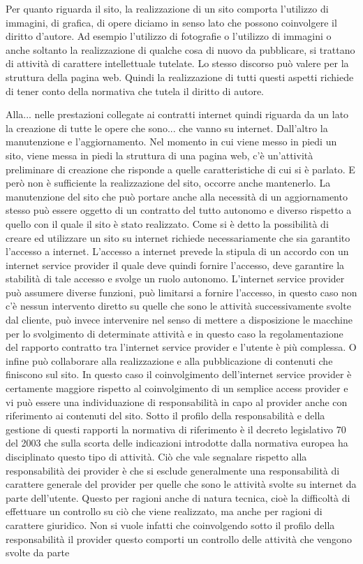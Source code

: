  Per quanto riguarda il sito, la realizzazione di un sito comporta l'utilizzo di immagini, di grafica, di opere diciamo in senso lato che possono coinvolgere il diritto d'autore. Ad esempio l'utilizzo di fotografie o l'utilizzo di immagini o anche soltanto la realizzazione di qualche cosa di nuovo da pubblicare, si trattano di attività di carattere intellettuale tutelate. Lo stesso discorso può valere per la struttura della pagina web. Quindi la realizzazione di tutti questi aspetti richiede di tener conto della normativa che tutela il diritto di autore. 
 

 Alla... nelle prestazioni collegate ai contratti internet quindi riguarda da un lato la creazione di tutte le opere che sono... che vanno su internet. Dall'altro la manutenzione e l'aggiornamento. Nel momento in cui viene messo in piedi un sito, viene messa in piedi la struttura di una pagina web, c'è un'attività preliminare di creazione che risponde a quelle caratteristiche di cui si è parlato. E però non è sufficiente la realizzazione del sito, occorre anche mantenerlo. La manutenzione del sito che può portare anche alla necessità di un aggiornamento stesso può essere oggetto di un contratto del tutto autonomo e diverso rispetto a quello con il quale il sito è stato realizzato. Come si è detto la possibilità di creare ed utilizzare un sito su internet richiede necessariamente che sia garantito l'accesso a internet. L'accesso a internet prevede la stipula di un accordo con un internet service provider il quale deve quindi fornire l'accesso, deve garantire la stabilità di tale accesso e svolge un ruolo autonomo. L'internet service provider può assumere diverse funzioni, può limitarsi a fornire l'accesso, in questo caso non c'è nessun intervento diretto su quelle che sono le attività successivamente svolte dal cliente, può invece intervenire nel senso di mettere a disposizione le macchine per lo svolgimento di determinate attività e in questo caso la regolamentazione del rapporto contratto tra l'internet service provider e l'utente è più complessa. O infine può collaborare alla realizzazione e alla pubblicazione di contenuti che finiscono sul sito. In questo caso il coinvolgimento dell'internet service provider è certamente maggiore rispetto al coinvolgimento di un semplice access provider e vi può essere una individuazione di responsabilità in capo al provider anche con riferimento ai contenuti del sito. Sotto il profilo della responsabilità e della gestione di questi rapporti la normativa di riferimento è il decreto legislativo 70 del 2003 che sulla scorta delle indicazioni introdotte dalla normativa europea ha disciplinato questo tipo di attività. Ciò che vale segnalare rispetto alla responsabilità dei provider è che si esclude generalmente una responsabilità di carattere generale del provider per quelle che sono le attività svolte su internet da parte dell'utente. Questo per ragioni anche di natura tecnica, cioè la difficoltà di effettuare un controllo su ciò che viene realizzato, ma anche per ragioni di carattere giuridico. Non si vuole infatti che coinvolgendo sotto il profilo della responsabilità il provider questo comporti un controllo delle attività che vengono svolte da parte 